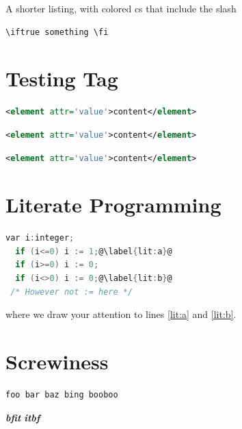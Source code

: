 \documentclass{article}
\begin{document}
A shorter listing, with colored cs that include the slash
\begin{lstlisting}[language={[LaTeX]TeX},texcsstyle=*{\color{blue}\bfseries}]
  \iftrue something \fi
\end{lstlisting}

\section{Testing Tag}
\begin{lstlisting}[language=XML,tagstyle=\bf]
<element attr='value'>content</element>
\end{lstlisting}
\begin{lstlisting}[language=XML,tagstyle=\bf,usekeywordsintag=false]
<element attr='value'>content</element>
\end{lstlisting}
\begin{lstlisting}[language=XML,tagstyle=\bf,markfirstintag]
<element attr='value'>content</element>
\end{lstlisting}

\section{Literate Programming}
\begin{lstlisting}[language=C,escapechar=@,literate=*{:=}{{$\gets$}}1 {<=}{{$\leq$}}1 {>=}{{$\geq$}}1 {<>}{{$\neq$}}1]
  var i:integer;
  if (i<=0) i := 1;@\label{lit:a}@
  if (i>=0) i := 0;
  if (i<>0) i := 0;@\label{lit:b}@
 /* However not := here */
\end{lstlisting}
where we draw your attention to lines \ref{lit:a} and \ref{lit:b}.

\section{Screwiness}
\begin{lstlisting}[language=bingo,keywordstyle=\bfseries\underbar,keywordstyle={[2]\itshape},index={[1][keywords2]{bar,baz}}]
foo bar baz bing booboo
\end{lstlisting}
{\bfseries\itshape bfit}
{\itshape\bfseries itbf}
\printindex
\end{document}
